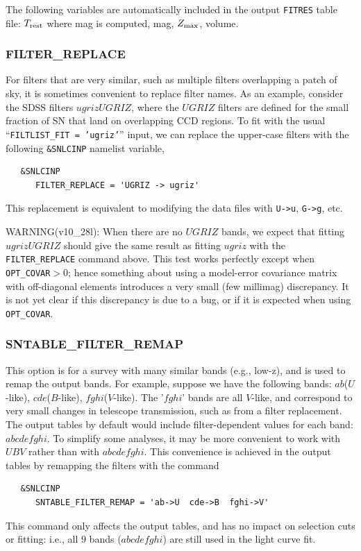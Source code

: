 \documentclass[12pt]{article}
\newcommand{\Trest}{T_{\rm rest}}
\newcommand{\zmax}{Z_{\rm max}}
\begin{document}
The following variables are automatically included in the output
{\tt FITRES} table file:
$\Trest$ where mag is computed, mag, $\zmax$, volume.


  \clearpage
  \subsubsection{FILTER\_REPLACE}
  \label{sss:filter_replace}

For filters that are very similar, such as multiple filters
overlapping a patch of sky, it is sometimes convenient
to replace filter names. As an example, consider the SDSS filters
$ugrizUGRIZ$, where the $UGRIZ$ filters are defined for the 
small fraction of SN that land on overlapping CCD regions. 
To fit with the usual ``{\tt FILTLIST\_FIT = 'ugriz'}'' input,
we can replace the upper-case filters with the
following {\tt \&SNLCINP} namelist variable,
%
\begin{verbatim}
   &SNLCINP
      FILTER_REPLACE = 'UGRIZ -> ugriz'
\end{verbatim}
%
This replacement is equivalent to modifying the data
files with {\tt U->u}, {\tt G->g}, etc.


\bigskip
WARNING(v10\_28l): 
When there are no $UGRIZ$ bands, we expect that fitting $ugrizUGRIZ$ 
should give the same result as fitting $ugriz$ with the 
{\tt FILTER\_REPLACE} command above. This test works perfectly 
except when  {\tt OPT\_COVAR}$>0$; 
hence something about using a model-error covariance matrix 
with off-diagonal elements introduces a very small 
(few millimag) discrepancy. It is not yet clear
if this discrepancy is due to a bug, or if it is expected
when using {\tt OPT\_COVAR}.


  \subsubsection{SNTABLE\_FILTER\_REMAP}
  \label{sss:filter_remap}

This option is for a survey with many similar bands (e.g., low-z),
and is used to remap the output bands. For example, suppose we
have the following bands: 
$ab$($U$-like), $cde$($B$-like), $fghi$($V$-like).
The '$fghi$' bands are all $V$-like, and correspond to very small 
changes in telescope transmission, such as from a filter replacement.
The output tables by default would include filter-dependent
values for each band: $abcdefghi$.  
To simplify some analyses, it may be more convenient to work
with $UBV$ rather than with $abcdefghi$.  
This convenience is achieved in the output tables
by remapping the filters with the command
\begin{verbatim}
   &SNLCINP
      SNTABLE_FILTER_REMAP = 'ab->U  cde->B  fghi->V'
\end{verbatim}
%
This command only affects the output tables, and has
no impact on selection cuts or fitting: 
i.e., all 9 bands ($abcdefghi$) are still
used in the light curve fit. 
\end{document}
